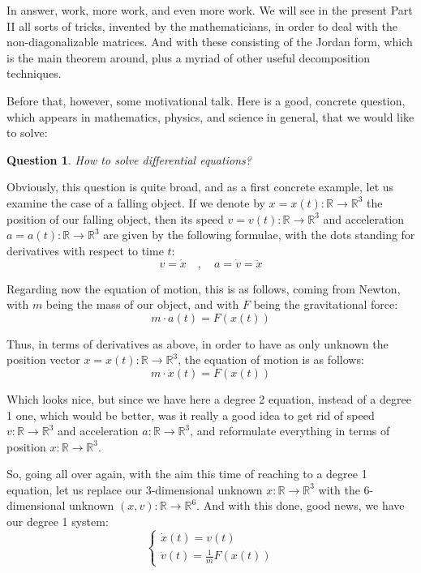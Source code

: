 \documentclass[12pt]{amsbook}
\newtheorem{question}[theorem]{Question}
\begin{document}
\bigskip

In answer, work, more work, and even more work. We will see in the present Part II all sorts of tricks, invented by the mathematicians, in order to deal with the non-diagonalizable matrices. And with these consisting of the Jordan form, which is the main theorem around, plus a myriad of other useful decomposition techniques.

\bigskip

Before that, however, some motivational talk. Here is a good, concrete question, which appears in mathematics, physics, and science in general, that we would like to solve:

\begin{question}
How to solve differential equations?
\end{question}

Obviously, this question is quite broad, and as a first concrete example, let us examine the case of a falling object. If we denote by $x=x(t):\mathbb R\to\mathbb R^3$ the position of our falling object, then its speed $v=v(t):\mathbb R\to\mathbb R^3$ and acceleration $a=a(t):\mathbb R\to\mathbb R^3$ are given by the following formulae, with the dots standing for derivatives with respect to time $t$:
$$v=\dot{x}\quad,\quad a=\dot{v}=\ddot{x}$$

Regarding now the equation of motion, this is as follows, coming from Newton, with $m$ being the mass of our object, and with $F$ being the gravitational force:
$$m\cdot a(t)=F(x(t))$$

Thus, in terms of derivatives as above, in order to have as only unknown the position vector $x=x(t):\mathbb R\to\mathbb R^3$, the equation of motion is as follows:
$$m\cdot\ddot{x}(t)=F(x(t))$$

Which looks nice, but since we have here a degree 2 equation, instead of a degree 1 one, which would be better, was it really a good idea to get rid of speed $v:\mathbb R\to\mathbb R^3$ and acceleration $a:\mathbb R\to\mathbb R^3$, and reformulate everything in terms of position $x:\mathbb R\to\mathbb R^3$.

\bigskip

So, going all over again, with the aim this time of reaching to a degree 1 equation, let us replace our 3-dimensional unknown $x:\mathbb R\to\mathbb R^3$ with the 6-dimensional unknown $(x,v):\mathbb R\to\mathbb R^6$. And with this done, good news, we have our degree 1 system:
$$\begin{cases}
\dot{x}(t)=v(t)\\
\dot{v}(t)=\frac{1}{m}F(x(t))
\end{cases}$$
\end{document}
